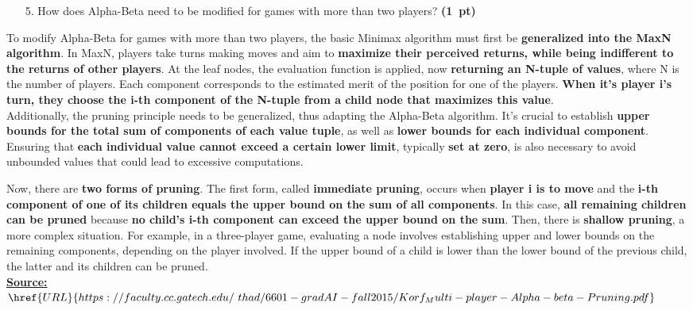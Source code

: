 \documentclass[11pt,a4paper]{report}
\begin{document}
\begin{enumerate}
\item[5.] How does Alpha-Beta need to be modified for games with more than two players? \textbf{(1~pt)}
\end{enumerate}

\begin{answers}[9cm]
\small{To modify Alpha-Beta for games with more than two players, the basic Minimax algorithm must first be \textbf{generalized into the MaxN algorithm}. In MaxN, players take turns making moves and aim to \textbf{maximize their perceived returns, while being indifferent to the returns of other players}. At the leaf nodes, the evaluation function is applied, now \textbf{returning an N-tuple of values}, where N is the number of players. Each component corresponds to the estimated merit of the position for one of the players. \textbf{When it's player i's turn, they choose the i-th component of the N-tuple from a child node that maximizes this value}. \\

Additionally, the pruning principle needs to be generalized, thus adapting the Alpha-Beta algorithm. It's crucial to establish \textbf{upper bounds for the total sum of components of each value tuple}, as well as \textbf{lower bounds for each individual component}. Ensuring that \textbf{each individual value cannot exceed a certain lower limit}, typically \textbf{set at zero}, is also necessary to avoid unbounded values that could lead to excessive computations.

Now, there are \textbf{two forms of pruning}. The first form, called \textbf{immediate pruning}, occurs when \textbf{player i is to move} and the \textbf{i-th component of one of its children equals the upper bound on the sum of all components}. In this case, \textbf{all remaining children can be pruned} because \textbf{no child's i-th component can exceed the upper bound on the sum}. Then, there is \textbf{shallow pruning}, a more complex situation. For example, in a three-player game, evaluating a node involves establishing upper and lower bounds on the remaining components, depending on the player involved. If the upper bound of a child is lower than the lower bound of the previous child, the latter and its children can be pruned. \\

\underline{\textbf{Source:}} $\href{URL}{https://faculty.cc.gatech.edu/~thad/6601-gradAI-fall2015/Korf_Multi-player-Alpha-beta-Pruning.pdf}$}

\end{answers}
\end{document}
